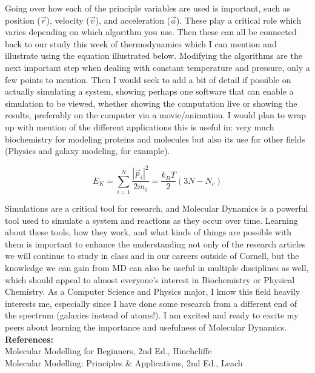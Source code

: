 \documentclass[11pt]{article}
\begin{document}
Going over how each of the principle variables are used is important, such as position ($\vec{r}$), velocity ($\vec{v}$), and acceleration ($\vec{a}$). These play a critical role which varies depending on which algorithm you use. Then these can all be connected back to our study this week of thermodynamics which I can mention and illustrate using the equation illustrated below. Modifying the algorithms are the next important step when dealing with constant temperature and pressure, only a few points to mention. Then I would seek to add a bit of detail if possible on actually simulating a system, showing perhaps one software that can enable a simulation to be viewed, whether showing the computation live or showing the results, preferably on the computer via a movie/animation. I would plan to wrap up with mention of the different applications this is useful in: very much biochemistry for modeling proteins and molecules but also its use for other fields (Physics and galaxy modeling, for example).

\begin{center}
\begin{equation}
  E_K = \displaystyle\sum_{i=1}^{N}\frac{|\vec{p}_i|^2}{2m_i} = \frac{k_BT}{2}(3N-N_c)
\end{equation}
\end{center}

Simulations are a critical tool for research, and Molecular Dynamics is a powerful tool used to simulate a system and reactions as they occur over time. Learning about these tools, how they work, and what kinds of things are possible with them is important to enhance the understanding not only of the research articles we will continue to study in class and in our careers outside of Cornell, but the knowledge we can gain from MD can also be useful in multiple disciplines as well, which should appeal to almost everyone's interest in Biochemistry or Physical Chemistry. As a Computer Science and Physics major, I know this field heavily interests me, especially since I have done some research from a different end of the spectrum (galaxies instead of atoms!). I am excited and ready to excite my peers about learning the importance and usefulness of Molecular Dynamics. \\


\textbf{References:}\\
Molecular Modelling for Beginners, 2nd Ed., Hinchcliffe \\
Molecular Modelling: Principles \& Applications, 2nd Ed., Leach
\end{document}
